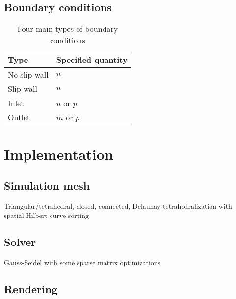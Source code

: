 \documentclass[12pt]{article}
\begin{document}
\subsection{Boundary conditions}

\indent

\begin{table}[H]
  \centering
  \begin{tabular}{| l | l |}
    \hline
    
    Type & Specified quantity \\
    
    \hline
    
    No-slip wall & $u$ \\

    \hline

    Slip wall & $u$ \\
    
    \hline

    Inlet & $u$ or $p$ \\
    
    \hline

    Outlet & $\dot m$ or $p$\\
    
    \hline
  \end{tabular}
  
  \caption{Four main types of boundary conditions}
\end{table}

\section{Implementation}

\subsection{Simulation mesh}

Triangular/tetrahedral, closed, connected, Delaunay tetrahedralization with spatial Hilbert curve sorting

\subsection{Solver}

Gauss-Seidel with some sparse matrix optimizations

\subsection{Rendering}
\end{document}
